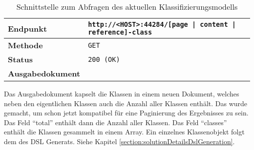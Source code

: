     \begin{table}[htb]
        \centering
        \begin{tabular}{|l|l|}
        \hline
        \textbf{Endpunkt} & \texttt{http://<HOST>:44284/[page | content | reference]-class}\\
        \hline
        \textbf{Methode} & \texttt{GET}\\
        \hline
        \textbf{Status} & \texttt{200 (OK)}\\
        \hline
        \textbf{Ausgabedokument} & \\
        \hline
        \end{tabular}
        \caption{Schnittstelle zum Abfragen des aktuellen Klassifizierungsmodells}
        \label{table:getClassesInterface}
    \end{table}

    Das Ausgabedokument kapselt die Klassen in einem neuen Dokument,
    welches neben den eigentlichen Klassen auch die Anzahl aller Klassen enthält.
    Das wurde gemacht, um schon jetzt kompatibel für eine Paginierung des Ergebnisses zu sein.
    Das Feld "`total"' enthält dann die Anzahl aller Klassen.
    Das Feld "`classes"' enthält die Klassen gesammelt in einem Array.
    Ein einzelnes Klassenobjekt folgt dem des DSL Generats.
    Siehe Kapitel \ref{section:solutionDetailsDslGeneration}.